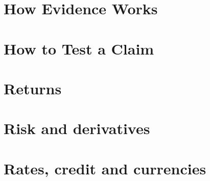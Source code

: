 \documentclass[12pt]{Beautybook-EN}
\begin{document}




\part{How Evidence Works}

\part{How to Test a Claim}
%   

%

%  

\part{Returns}
  

\part{Risk and derivatives}

\part{Rates, credit and currencies}
\end{document}
